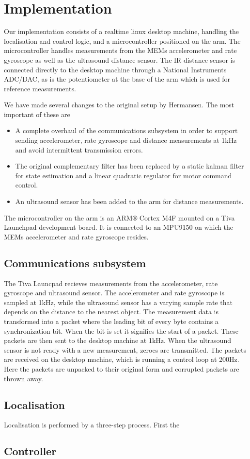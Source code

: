 \section{Implementation}
Our implementation consists of a realtime linux desktop machine, handling the localisation and control logic, and a microcontroller
positioned on the arm. The microcontroller handles measurements from the MEMs accelerometer and rate gyroscope as well as the ultrasound
distance sensor. The IR distance sensor is connected directly to the desktop machine through a National Instruments ADC/DAC, as is the 
potentiometer at the base of the arm which is used for reference measurements.

We have made several changes to the original setup by Hermansen. The most important of these are

\begin{itemize}
		\item A complete overhaul of the communications subsystem in order to support sending accelerometer, rate gyroscope and 
			distance measurements at 1kHz and avoid intermittent transmission errors. 
		\item The original complementary filter has been replaced by a static kalman filter for state estimation and a linear 
			quadratic regulator for motor command control.
			\item An ultrasound sensor has been added to the arm for distance measurements.
\end{itemize}

The microcontroller on the arm is an ARM® Cortex M4F mounted on a Tiva Launchpad development board.
It is connected to an MPU9150 on which the MEMs accelerometer and rate gyroscope resides.

\subsection{Communications subsystem}
The Tiva Launcpad recieves measurements from the accelerometer, rate gyroscope and ultrasound sensor. The accelerometer and 
rate gyroscope is sampled at 1kHz, while the ultrasound sensor has a varying sample rate that depends on the distance to the nearest
object. The measurement data is transformed into a packet where the leading bit of every byte contains a synchronization bit. When
the bit is set it signifies the start of a packet. These packets are then sent to the desktop machine at 1kHz. When the ultrasound 
sensor is not ready with a new measurement, zeroes are transmitted. The packets are received on the desktop machine, which is 
running a control loop at 200Hz. Here the packets are unpacked to their original form and corrupted packets are thrown away.
\subsection{Localisation}
Localisation is performed by a three-step process. First the 
\subsection{Controller}
